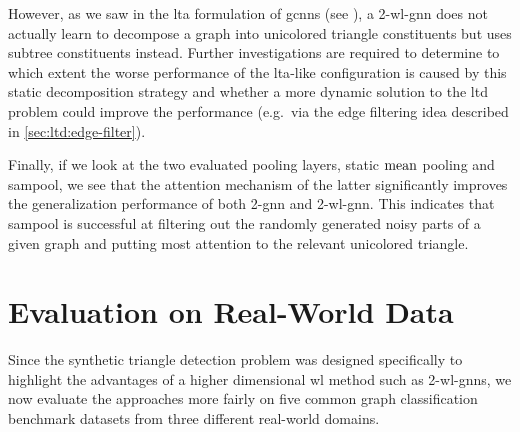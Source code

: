 However, as we saw in the \ac{lta} formulation of \acp{gcnn} (see ), a 2-\acs{wl}-\acs{gnn} does not actually learn to decompose a graph into unicolored triangle constituents but uses subtree constituents instead.
Further investigations are required to determine to which extent the worse performance of the \acs{lta}-like configuration is caused by this static decomposition strategy and whether a more dynamic solution to the \acf{ltd} problem could improve the performance (e.g.\ via the edge filtering idea described in \cref{sec:ltd:edge-filter}).

Finally, if we look at the two evaluated pooling layers, static $\operatorname{mean}$ pooling and \ac{sampool}, we see that the attention mechanism of the latter significantly improves the generalization performance of both 2-\acs{gnn} and 2-\acs{wl}-\acs{gnn}.
This indicates that \ac{sampool} is successful at filtering out the randomly generated noisy parts of a given graph and putting most attention to the relevant unicolored triangle.

\section{Evaluation on Real-World Data}%
\label{sec:eval:real}

Since the synthetic triangle detection problem was designed specifically to highlight the advantages of a higher dimensional \ac{wl} method such as 2-\ac{wl}-\acsp{gnn}, we now evaluate the approaches more fairly on five common graph classification benchmark datasets from three different real-world domains.

